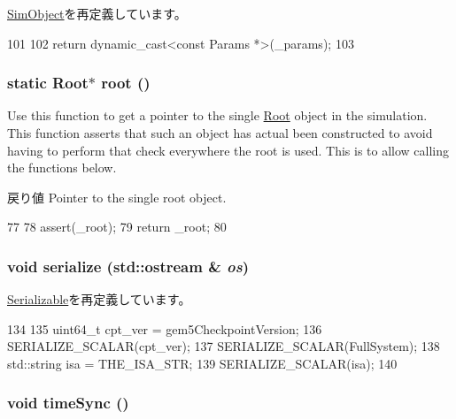 \hyperlink{classSimObject_acd3c3feb78ae7a8f88fe0f110a718dff}{SimObject}を再定義しています。


\begin{DoxyCode}
101     {
102         return dynamic_cast<const Params *>(_params);
103     }
\end{DoxyCode}
\hypertarget{classRoot_ac0ea009f164c8391bd2371c57518a5b2}{
\subsubsection[{root}]{\setlength{\rightskip}{0pt plus 5cm}static {\bf Root}$\ast$ root ()}}
\label{classRoot_ac0ea009f164c8391bd2371c57518a5b2}
Use this function to get a pointer to the single \hyperlink{classRoot}{Root} object in the simulation. This function asserts that such an object has actual been constructed to avoid having to perform that check everywhere the root is used. This is to allow calling the functions below.

\begin{DoxyReturn}{戻り値}
Pointer to the single root object. 
\end{DoxyReturn}



\begin{DoxyCode}
77     {
78         assert(_root);
79         return _root;
80     }
\end{DoxyCode}
\hypertarget{classRoot_a53e036786d17361be4c7320d39c99b84}{
\subsubsection[{serialize}]{\setlength{\rightskip}{0pt plus 5cm}void serialize (std::ostream \& {\em os})}}
\label{classRoot_a53e036786d17361be4c7320d39c99b84}


\hyperlink{classSerializable_ad6272f80ae37e8331e3969b3f072a801}{Serializable}を再定義しています。


\begin{DoxyCode}
134 {
135     uint64_t cpt_ver = gem5CheckpointVersion;
136     SERIALIZE_SCALAR(cpt_ver);
137     SERIALIZE_SCALAR(FullSystem);
138     std::string isa = THE_ISA_STR;
139     SERIALIZE_SCALAR(isa);
140 }
\end{DoxyCode}
\hypertarget{classRoot_a9a1e892e8081bcf0f3d918f378d78e52}{
\subsubsection[{timeSync}]{\setlength{\rightskip}{0pt plus 5cm}void timeSync ()}}
\label{classRoot_a9a1e892e8081bcf0f3d918f378d78e52}



